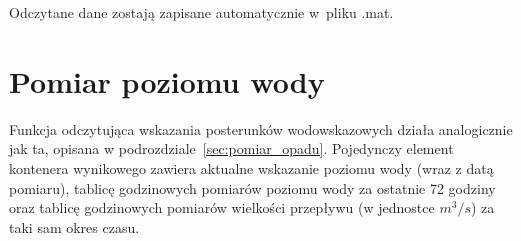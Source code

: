 Odczytane dane zostają zapisane automatycznie w~pliku .mat.

\section{Pomiar poziomu wody}
Funkcja odczytująca wskazania posterunków wodowskazowych działa analogicznie jak ta, opisana w podrozdziale~\ref{sec:pomiar_opadu}. Pojedynczy element kontenera wynikowego zawiera aktualne wskazanie poziomu wody (wraz z datą pomiaru), tablicę godzinowych pomiarów poziomu wody za ostatnie 72 godziny oraz tablicę godzinowych pomiarów wielkości przepływu (w jednostce $m^3/s$) za taki sam okres czasu.